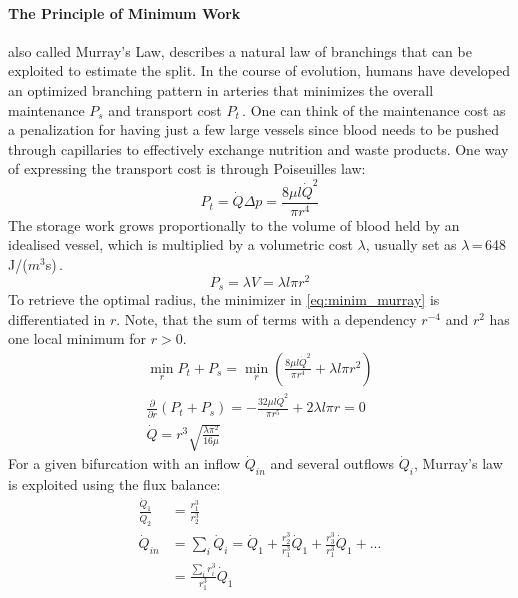 \paragraph{The Principle of Minimum Work} also called Murray's Law, describes a natural law of branchings that can be exploited to estimate the split. In the course of evolution, humans have developed an optimized branching pattern in arteries that minimizes the overall maintenance $P_s$ and transport cost $P_t$\,\cite{Helthuis2019, Keelan2021}. One can think of the maintenance cost as a penalization for having just a few large vessels since blood needs to be pushed through capillaries to effectively exchange nutrition and waste products. One way of expressing the transport cost is through Poiseuilles law:
\begin{equation*}
	P_t = \dot{Q}\Delta p = \frac{8\mu l \dot{Q}^2}{\pi r^4}
\end{equation*}
The storage work grows proportionally to the volume of blood held by an idealised vessel, which is multiplied by a volumetric cost $\lambda$, usually set as $\lambda$\,=\,648\,J/($m^3$s)\,\cite{Keelan2019}.
\begin{equation*}
	P_s=\lambda V = \lambda l\pi r^2
\end{equation*}
To retrieve the optimal radius, the minimizer in \autoref{eq:minim_murray} is differentiated in $r$. Note, that the sum of terms with a dependency $r^{-4}$ and $r^{2}$ has one local minimum for $r>$0.
\begin{align*}
	\min_r P_t + P_s = \min_r \left(\frac{8\mu l \dot{Q}^2}{\pi r^4} + \lambda l\pi r^2\right)\label{eq:minim_murray} \\[0.2em]
	\frac{\partial}{\partial r}(P_t + P_s) = -\frac{32\mu l \dot{Q}^2}{\pi r^5} + 2\lambda l\pi r = 0                 \\[0.2em]
	\dot{Q} = r^3\sqrt{\frac{\lambda\pi^2}{16\mu}}
\end{align*}
For a given bifurcation with an inflow $\dot{Q}_{in}$ and several outflows $\dot{Q}_{i}$, Murray's law is exploited using the flux balance:
\begin{align*}
	\frac{\dot{Q}_{1}}{\dot{Q}_{2}} & = \frac{r_1^3}{r_2^3}                                                                                      \\
	\dot{Q}_{in}                    & = \sum_i \dot{Q}_{i} = \dot{Q}_{1} + \frac{r_2^3}{r_1^3}\dot{Q}_{1} + \frac{r_3^3}{r_1^3}\dot{Q}_{1} + ... \\
	                                & =\frac{\sum_i r_i^3}{r_1^3}\dot{Q}_{1}
\end{align*}
